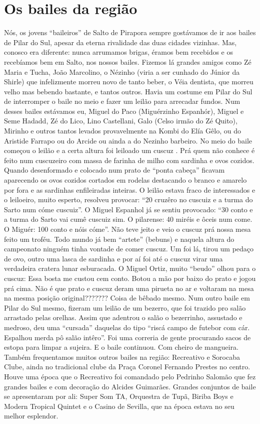 \documentclass[12pt,brazil,]{book}
\begin{document}
\section{Os bailes da região}\label{os-bailes-da-regiuxe3o}

Nós, os jovens ``baileiros'' de Salto de Pirapora sempre gostávamos de
ir aos bailes de Pilar do Sul, apesar da eterna rivalidade das duas
cidades vizinhas. Mas, conosco era diferente: nunca arrumamos brigas,
éramos bem recebidos e os recebíamos bem em Salto, nos nossos bailes.
Fizemos lá grandes amigos como Zé Maria e Tucha, João Marcolino, o
Nézinho (viria a ser cunhado do Júnior da Shirle) que infelizmente
morreu novo de tanto beber, o Véia dentista, que morreu velho mas
bebendo bastante, e tantos outros. Havia um costume em Pilar do Sul de
interromper o baile no meio e fazer um leilão para arrecadar fundos. Num
desses bailes estávamos eu, Miguel do Paco (Miguérzinho Espanhór),
Miguel e Seme Hadadd, Zé do Lico, Lino Castellani, Galo (Celso irmão do
Zé Quito), Mirinho e outros tantos levados provavelmente na Kombi do
Elía Gêlo, ou do Aristide Farrapo ou do Arcide ou ainda a do Nezinho
barbeiro. No meio do baile começou o leilão e a certa altura foi
leiloado um cuscuz . Prá quem não conhece é feito num cuscuzeiro com
massa de farinha de milho com sardinha e ovos cozidos. Quando
desenformado e colocado num prato de ``ponta cabeça'' ficavam aparecendo
os ovos cozidos cortados em rodelas destacando o branco e amarelo por
fora e as sardinhas enfileiradas inteiras. O leilão estava fraco de
interessados e o leiloeiro, muito esperto, resolveu provocar: ``20
cruzêro no cuscuiz e a turma do Sarto num cóme cuscuiz''. O Miguel
Espanhol já se sentiu provocado: ``30 conto e a turma do Sarto vai cumê
cuscuiz sim. O pilarense: 40 miréis e ôceis num come. O Miguér: 100
conto e nóis cóme''. Não teve jeito e veio o cuscuz prá nossa mesa feito
um troféu. Todo mundo já bem ``artete'' (bebuns) e naquela altura do
campeonato ninguém tinha vontade de comer cuscuz. Um foi lá, tirou um
pedaço de ovo, outro uma lasca de sardinha e por aí foi até o cuscuz
virar uma verdadeira cratera lunar esburacada. O Miguel Ortiz, muito
``beudo'' olhou para o cuscuz: Essa bosta me custou cem conto. Botou a
mão por baixo do prato e jogou prá cima. Não é que prato e cuscuz deram
uma pirueta no ar e voltaram na mesa na mesma posição original???????
Coisa de bêbado mesmo. Num outro baile em Pilar do Sul mesmo, fizeram um
leilão de um bezerro, que foi trazido pro salão arrastado pelas orelhas.
Assim que adentrou o salão o bezerrinho, assustado e medroso, deu uma
``cursada'' daquelas do tipo ``riscá campo de futebor com cár. Espalhou
merda pô salão intêro''. Foi uma correria de gente procurando sacos de
estopa para limpar a sujeira. E o baile continuou. Com cheiro de
mangueira. Também frequentamos muitos outros bailes na região:
Recreativo e Sorocaba Clube, ainda no tradicional clube da Praça Coronel
Fernando Prestes no centro. Houve uma época que o Recreativo foi
comandado pelo Pedrinho Salomão que fez grandes bailes e com decoração
do Alcides Guimarães. Grandes conjuntos de baile se apresentaram por
ali: Super Som TA, Orquestra de Tupã, Biriba Boys e Modern Tropical
Quintet e o Casino de Sevilla, que na época estava no seu melhor
esplendor.
\end{document}
